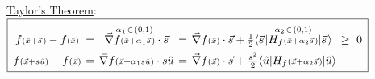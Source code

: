 \documentclass[12pt]{article}
\begin{document}
\vspace{5pt}
\underline{Taylor's Theorem}: \( \boxed{
    \arraycolsep=2pt \begin{array}{c c c c l c}
        f{\scriptstyle(\bar{x} + \vec{s}\hspace{1pt})} - f{\scriptstyle(\bar{x})} &=
            &\vec{\nabla} \begin{gathered}[b]
                    {\scriptstyle \alpha_1 \hspace{1pt} \in\hspace{1pt} (0,1)}
                        \\[-5pt]
                    f{\scriptstyle(\bar{x} + \alpha_1 \vec{s}\hspace{1pt})}
                \end{gathered} \cdot \vec{s}
            &=
            &\vec{\nabla} f{\scriptstyle(\bar{x})} \cdot \vec{s} 
                + \tfrac{1}{2} 
                \langle \vec{s}\hspace{1pt} | 
                \begin{gathered}[b]
                    {\scriptstyle \alpha_2 \hspace{1pt}\in\hspace{1pt} (0,1)}
                        \\[-5pt]
                    H_f{\scriptstyle(\bar{x} + \alpha_2 \vec{s} \hspace{1pt})}
                \end{gathered} 
                | \vec{s} \hspace{1pt} \rangle
            &\geq\ 0
            \\[5pt]
        f{\scriptstyle(\vec{x} + s \hat{u})} - f{\scriptstyle(\vec{x})} &=
            &\vec{\nabla} f{\scriptstyle(\vec{x} + \alpha_1 s \hat{u})} \cdot s \hat{u}
            &=
            &\vec{\nabla} f{\scriptstyle(\vec{x})} \cdot \vec{s} 
                + \tfrac{s^2}{2} 
                \langle \hat{u} | 
                H_f{\scriptstyle(\vec{x} + \alpha_2 \vec{s} \hspace{1pt})}
                | \hat{u} \rangle
    \end{array}
}\)
\end{document}
